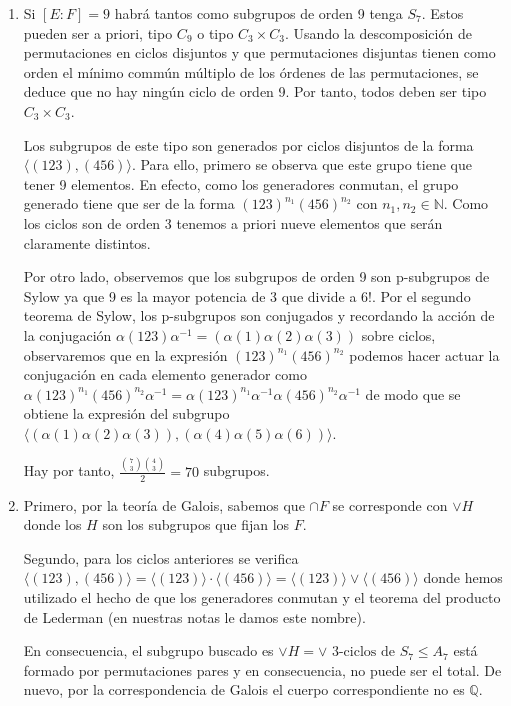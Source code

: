 \begin{enumerate}
\item Si $[E:F] = 9$ habrá tantos como subgrupos de orden 9 tenga $S_7$. Estos pueden ser a priori, tipo $C_9$ o tipo $C_3 \times C_3$. Usando la descomposición de permutaciones en ciclos disjuntos y que permutaciones disjuntas tienen como orden el mínimo commún múltiplo de los órdenes de las permutaciones, se deduce que no hay ningún ciclo de orden 9. Por tanto, todos deben ser tipo $C_3 \times C_3$.

Los subgrupos de este tipo son generados por ciclos disjuntos de la forma $\langle (123),(456) \rangle$. Para ello, primero se observa que este grupo tiene que tener 9 elementos. En efecto, como los generadores conmutan, el grupo generado tiene que ser de la forma $(123)^{n_1} (456)^{n_2}$ con $n_1,n_2 \in \mathbb{N}$. Como los ciclos son de orden 3 tenemos a priori nueve elementos que serán claramente distintos. 

Por otro lado, observemos que los subgrupos de orden 9 son p-subgrupos de Sylow ya que 9 es la mayor potencia de 3 que divide a $6!$. Por el segundo teorema de Sylow, los p-subgrupos son conjugados y recordando la acción de la conjugación $\alpha (123) \alpha^{-1} = (\alpha(1)\alpha(2)\alpha(3))$ sobre ciclos, observaremos que en la expresión $(123)^{n_1} (456)^{n_2}$ podemos hacer actuar la conjugación en cada elemento generador como $\alpha(123)^{n_1} (456)^{n_2}\alpha^{-1} = \alpha(123)^{n_1}\alpha^{-1}\alpha(456)^{n_2}\alpha^{-1}$ de modo que se obtiene la expresión del subgrupo $\langle (\alpha(1)\alpha(2)\alpha(3)),(\alpha(4)\alpha(5)\alpha(6)) \rangle$. 

Hay por tanto, $\frac{\binom{7}{3}\binom{4}{3}}{2} = 70$  subgrupos. 

\item Primero, por la teoría de Galois, sabemos que $\cap F$ se corresponde con $\lor H$ donde los $H$ son los subgrupos que fijan los $F$. 

Segundo, para los ciclos anteriores se verifica $\langle (123),(456) \rangle = \langle (123) \rangle \cdot \langle (456) \rangle = \langle (123) \rangle \lor \langle (456) \rangle$ donde hemos utilizado el hecho de que los generadores conmutan y el teorema del producto de Lederman (en nuestras notas le damos este nombre). 

En consecuencia, el subgrupo buscado es $\lor H = \lor \text{ 3-ciclos de } S_7 \le A_7$ está formado por permutaciones pares y en consecuencia, no puede ser el total. De nuevo, por la correspondencia de Galois el cuerpo correspondiente no es $\mathbb{Q}$.


\end{enumerate}

